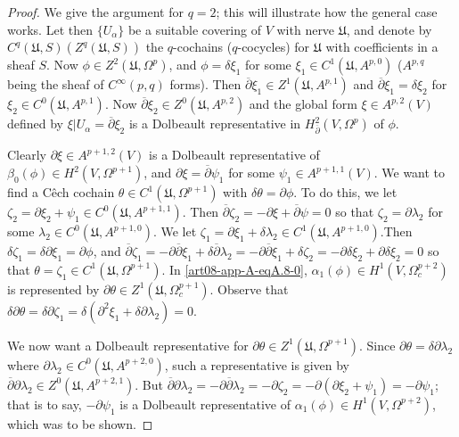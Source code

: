 \begin{proof}
We give the argument for $q=2$; this will illustrate how the general case works. Let then $\{U_{\alpha}\}$ be a suitable covering of $V$ with nerve $\mathfrak{U}$, and denote by $C^{q}(\mathfrak{U},S)(Z^{q}(\mathfrak{U},S))$ the $q$-cochains ($q$-cocycles) for $\mathfrak{U}$ with coefficients in a sheaf $S$. Now $\phi\in Z^{2}(\mathfrak{U},\Omega^{p})$, and $\phi=\delta\xi_{1}$ for some $\xi_{1}\in C^{1}(\mathfrak{U},A^{p,0})$ ($A^{p,q}$ being the sheaf of $C^{\infty}(p,q)$ forms). Then $\overline{\partial}\xi_{1}\in Z^{1}(\mathfrak{U},A^{p,1})$ and $\overline{\partial}\xi_{1}=\delta \xi_{2}$ for $\xi_{2}\in C^{0}(\mathfrak{U},A^{p,1})$. Now $\overline{\partial}\xi_{2}\in Z^{0}(\mathfrak{U},A^{p,2})$ and the global form $\xi\in A^{p,2}(V)$ defined by $\xi|U_{\alpha}=\overline{\partial}\xi_{2}$ is a Dolbeault representative in $H^{2}_{\overline{\partial}}(V,\Omega^{p})$ of $\phi$.

Clearly $\partial\xi\in A^{p+1,2}(V)$ is a Dolbeault representative of $\beta_{0}(\phi)\in H^{2}(V,\Omega^{p+1})$, and $\partial \xi=\overline{\partial}\psi_{1}$ for some $\psi_{1}\in A^{p+1,1}(V)$. We want to find a C\^ech cochain $\theta\in C^{1}(\mathfrak{U},\Omega^{p+1})$ with $\delta\theta=\partial\phi$. To do this, we let $\zeta_{2}=\partial\xi_{2}+\psi_{1}\in C^{0}(\mathfrak{U},A^{p+1,1})$. Then $\overline{\partial}\zeta_{2}=-\partial \xi +\overline{\partial}\psi=0$ so that $\zeta_{2}=\partial \lambda_{2}$ for some $\lambda_{2}\in C^{0}(\mathfrak{U},A^{p+1,0})$. We let $\zeta_{1}=\partial \xi_{1}+\delta\lambda_{2}\in C^{1}(\mathfrak{U}, A^{p+1,0})$.\pageoriginale Then $\delta \zeta_{1}=\delta \partial \xi_{1}=\partial \phi$, and $\overline{\partial}\zeta_{1}=-\partial\overline{\partial}\xi_{1}+\delta\overline{\partial}\lambda_{2}=-\partial\overline{\partial}\xi_{1}+\delta\zeta_{2}=-\partial\delta\xi_{2}+\partial \delta\xi_{2}=0$ so that $\theta=\zeta_{1}\in C^{1}(\mathfrak{U},\Omega^{p+1})$. In \ref{art08-app-A-eqA.8-0}, $\alpha_{1}(\phi)\in H^{1}(V,\Omega^{p+2}_{c})$ is represented by $\partial \theta\in Z^{1}(\mathfrak{U},\Omega^{p+1}_{c})$. Observe that $\delta\partial \theta=\delta\partial \zeta_{1}=\delta(\partial^{2}\xi_{1}+\delta\partial \lambda_{2})=0$.

We now want a Dolbeault representative for $\partial \theta\in Z^{1}(\mathfrak{U},\Omega^{p+1})$. Since $\partial\theta=\delta\partial \lambda_{2}$ where $\partial\lambda_{2}\in C^{0}(\mathfrak{U},A^{p+2,0})$, such a representative is given by $\overline{\partial}\partial \lambda_{2}\in Z^{0}(\mathfrak{U},A^{p+2,1})$. But $\overline{\partial}\partial\lambda_{2}=-\partial\overline{\partial}\lambda_{2}=-\partial\zeta_{2}=-\partial (\partial \xi_{2}+\psi_{1})=-\partial\psi_{1}$; that is to say, $-\partial\psi_{1}$ is a Dolbeault representative of $\alpha_{1}(\phi)\in H^{1}(V,\Omega^{p+2})$, which was to be shown.


\end{proof}
